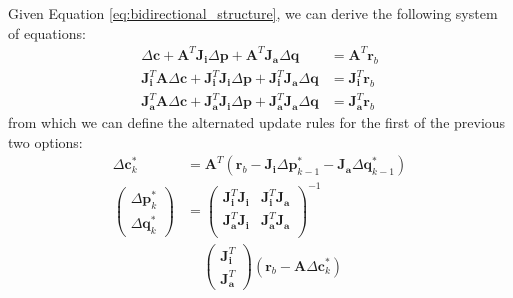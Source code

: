 Given Equation \ref{eq:bidirectional_structure}, we can derive the following system of equations:
\begin{equation}
    \begin{aligned}
        \Delta\mathbf{c} + \mathbf{A}^T \mathbf{J}_\mathbf{i} \Delta\mathbf{p} + \mathbf{A}^T \mathbf{J}_\mathbf{a} \Delta\mathbf{q} & = \mathbf{A}^T \mathbf{r}_b 
        \\
        \mathbf{J}_{\mathbf{i}}^T \mathbf{A} \Delta\mathbf{c} + \mathbf{J}_{\mathbf{i}}^T \mathbf{J}_\mathbf{i} \Delta\mathbf{p} + \mathbf{J}_{\mathbf{i}}^T \mathbf{J}_\mathbf{a} \Delta\mathbf{q} & = \mathbf{J}_{\mathbf{i}}^T \mathbf{r}_b 
        \\
        \mathbf{J}_{\mathbf{a}}^T \mathbf{A} \Delta\mathbf{c} + \mathbf{J}_{\mathbf{a}}^T \mathbf{J}_\mathbf{i} \Delta\mathbf{p} + \mathbf{J}_{\mathbf{a}}^T \mathbf{J}_\mathbf{a} \Delta\mathbf{q} & = \mathbf{J}_{\mathbf{a}}^T \mathbf{r}_b 
    \label{eq:bidirectional_alt_system}
    \end{aligned}
\end{equation}
from which we can define the alternated update rules for the first of the previous two options:
\begin{equation}
    \begin{aligned}
        \Delta\mathbf{c}^*_k & = \mathbf{A}^T \left( \mathbf{r}_b - \mathbf{J}_{\mathbf{i}} \Delta\mathbf{p}^*_{k-1} - \mathbf{J}_{\mathbf{a}} \Delta\mathbf{q}^*_{k-1} \right) 
        \\
        \begin{pmatrix}
            \Delta\mathbf{p}^{*}_k
            \\
            \Delta\mathbf{q}^{*}_k
        \end{pmatrix} & = 
        \begin{pmatrix}
            \mathbf{J}_{\mathbf{i}}^T \mathbf{J}_{\mathbf{i}} & \mathbf{J}_{\mathbf{i}}^T \mathbf{J}_{\mathbf{a}}
            \\ 
            \mathbf{J}_{\mathbf{a}}^T \mathbf{J}_{\mathbf{i}} & \mathbf{J}_{\mathbf{a}}^T \mathbf{J}_{\mathbf{a}}
            \\
        \end{pmatrix}^{-1}
        \\
        & \quad \,
        \begin{pmatrix}
            \mathbf{J}_{\mathbf{i}}^T
            \\
            \mathbf{J}_{\mathbf{a}}^T
        \end{pmatrix} \left(\mathbf{r}_b - \mathbf{A} \Delta\mathbf{c}^*_{k}\right) 
        \label{eq:bidirectional_alt_solution}
    \end{aligned}
\end{equation}
